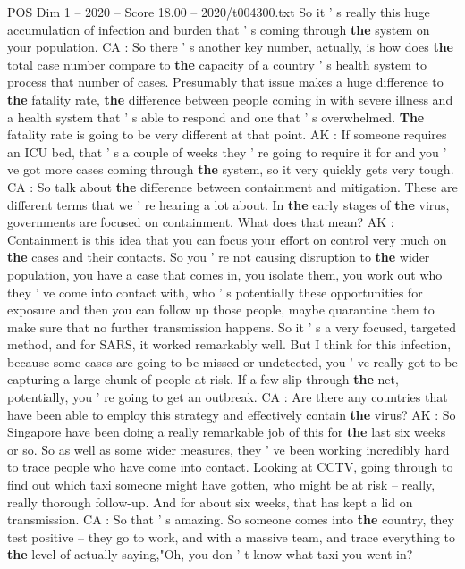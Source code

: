 \begin{textsample}{POS Dim 1 – 2020 – Score 18.00 – 2020/t004300.txt}
So it ' s really this huge accumulation of infection and burden that ' s coming through \textbf{the} system on your population.
CA : So there ' s another key number, actually, is how does \textbf{the} total case number compare to \textbf{the} capacity of a country ' s health system to process that number of cases.
Presumably that issue makes a huge difference to \textbf{the} fatality rate, \textbf{the} difference between people coming in with severe illness and a health system that ' s able to respond and one that ' s overwhelmed. \textbf{The} fatality rate is going to be very different at that point.
AK : If someone requires an ICU bed, that ' s a couple of weeks they ' re going to require it for and you ' ve got more cases coming through \textbf{the} system, so it very quickly gets very tough.
CA : So talk about \textbf{the} difference between containment and mitigation.
These are different terms that we ' re hearing a lot about.
In \textbf{the} early stages of \textbf{the} virus, governments are focused on containment.
What does that mean?
AK : Containment is this idea that you can focus your effort on control very much on \textbf{the} cases and their contacts.
So you ' re not causing disruption to \textbf{the} wider population, you have a case that comes in, you isolate them, you work out who they ' ve come into contact with, who ' s potentially these opportunities for exposure and then you can follow up those people, maybe quarantine them to make sure that no further transmission happens.
So it ' s a very focused, targeted method, and for SARS, it worked remarkably well.
But I think for this infection, because some cases are going to be missed or undetected, you ' ve really got to be capturing a large chunk of people at risk.
If a few slip through \textbf{the} net, potentially, you ' re going to get an outbreak.
CA : Are there any countries that have been able to employ this strategy and effectively contain \textbf{the} virus?
AK : So Singapore have been doing a really remarkable job of this for \textbf{the} last six weeks or so.
So as well as some wider measures, they ' ve been working incredibly hard to trace people who have come into contact.
Looking at CCTV, going through to find out which taxi someone might have gotten, who might be at risk -- really, really thorough follow-up.
And for about six weeks, that has kept a lid on transmission.
CA : So that ' s amazing.
So someone comes into \textbf{the} country, they test positive -- they go to work, and with a massive team, and trace everything to \textbf{the} level of actually saying,"Oh, you don ' t know what taxi you went in?

\end{textsample}

